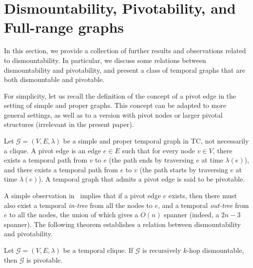 \documentclass[USenglish, a4paper, thm-restate,numberwithinsect, cleveref]{lipics-v2021}
\newcommand{\G}{\ensuremath{\mathcal{G}}\xspace}
\begin{document}
\section{Dismountability, Pivotability, and Full-range graphs}
\label{sec:misc}

In this section, we provide a collection of further results and observations related to dismountability. In particular, we discuss some relations between dismountability and pivotability, and present a class of temporal graphs that are both dismountable and pivotable.

For simplicity, let us recall the definition of the concept of a pivot edge in the setting of simple and proper graphs. This concept can be adapted to more general settings, as well as to a version with pivot nodes or larger pivotal structures (irrelevant in the present paper).

\begin{definition}[Pivotability]
  Let $\G=(V,E,\lambda)$ be a simple and proper temporal graph in \textsf{TC}, not necessarily a clique. A pivot edge is an edge $e\in E$ such that for every node $v\in V$, there exists a temporal path from $v$ to $e$ (the path ends by traversing $e$ at time $\lambda(e)$), and there exists a temporal path from $e$ to $v$ (the path starts by traversing $e$ at time $\lambda(e)$). A temporal graph that admits a pivot edge is said to be pivotable.
\end{definition}

A simple observation in~\cite{BFJ03} implies that if a pivot edge $e$ exists, then there must also exist a temporal \emph{in-tree} from all the nodes to $e$, and a temporal \emph{out-tree} from $e$ to all the nodes, the union of which gives a $O(n)$ spanner (indeed, a $2n-3$ spanner).
The following theorem establishes a relation between dismountability and pivotability.

\begin{theorem}
Let $\G=(V,E,\lambda)$ be a temporal clique. If $\G$ is recursively $k$-hop dismountable, then $\G$ is pivotable.
\end{theorem}
\end{document}
